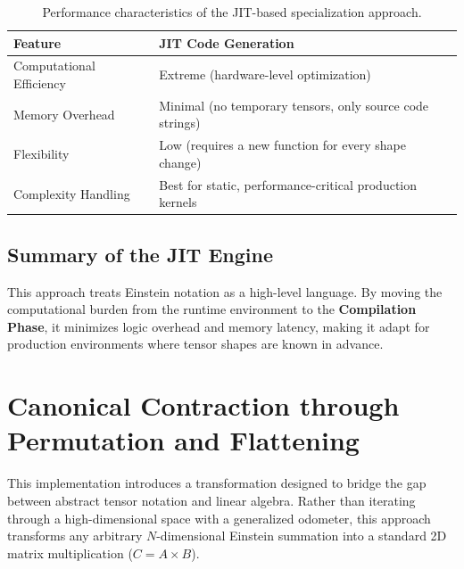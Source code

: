 \documentclass[binding=0.6cm]{sapthesis}
\begin{document}
\begin{table}[h]
	\centering
	\begin{tabular}{|l|l|}
		\hline
		\textbf{Feature}         & \textbf{JIT Code Generation}                             \\ \hline
		Computational Efficiency & Extreme (hardware-level optimization)                    \\ \hline
		Memory Overhead          & Minimal (no temporary tensors, only source code strings) \\ \hline
		Flexibility              & Low (requires a new function for every shape change)     \\ \hline
		Complexity Handling      & Best for static, performance-critical production kernels \\ \hline
	\end{tabular}
	\caption{Performance characteristics of the JIT-based specialization approach.}
\end{table}

\subsection{Summary of the JIT Engine}

This approach treats Einstein notation as a high-level language. By moving the computational burden from the runtime environment to the \textbf{Compilation Phase}, it minimizes logic overhead and memory latency, making it adapt for production environments where tensor shapes are known in advance.
\section{Canonical Contraction through Permutation and Flattening}

This implementation introduces a transformation designed to bridge the gap between abstract tensor notation and linear algebra. Rather than iterating through a high-dimensional space with a generalized odometer, this approach transforms any arbitrary $N$-dimensional Einstein summation into a standard 2D matrix multiplication ($C = A \times B$).
\end{document}
